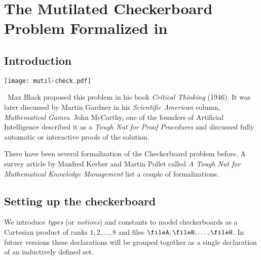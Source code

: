 \section{The Mutilated Checkerboard Problem Formalized in \Naproche{}}\label{sec:formalization}



\subsection{Introduction}
%
%
\begin{center}
  \texttt{[image: mutil-check.pdf]}
\end{center}

\
Max Black proposed this problem in his book
\textit{Critical Thinking} (1946).
%
It was later discussed by Martin Gardner in his
\textit{Scientific American} column, \textit{Mathematical Games}.
%
John McCarthy, one of the
founders of Artificial Intelligence described it as a
\textit{Tough Nut for Proof Procedures}
and discussed fully automatic or interactive proofs of the solution.

There have been several formalization of the Checkerboard problem before. A
survey article by Manfred Kerber and Martin Pollet called {\emph{A Tough Nut
for Mathematical Knowledge Management}} list a couple of formalizations.




\subsection{Setting up the checkerboard}

\begin{comment}
\begin{forthel}
    [read ZFC.ftl]
    [synonym rank/ranks] [synonym file/files] [synonym square/squares] [synonym domino/dominoes]
\end{forthel}
\end{comment}

We introduce \textit{types} (or \textit{notions}) and constants
to model checkerboards as a Cartesian product of
ranks $1, 2, \ldots, 8$ and files $\fileA, \fileB, \ldots, \fileH$.
In future versions these declarations will be grouped together as a single declaration of an inductively defined set.



